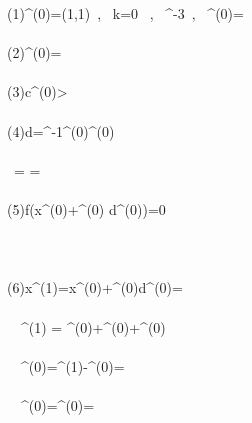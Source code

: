 \documentclass[]{report}
\begin{document}
\begin{program}
\left(1\right)\quad {}^{(0)}=\left(1,1\right)\ , \, k=0 \ , \ ^{-3}\ , \ ^{(0)}=\left[\begin{array}{cc}1 & 0 \\0 &1\end{array}\right] \\~ \\
\left(2\right)\quad {}^{(0)}=\left[-4 \ , \ 2\right]\\~  \\
\left(3\right)\quad \lvert \mathbf c^{(0)}>\epsilon\\~  \\
\left(4\right)\quad \mathbf d={^{-1}}^{(0)}^{(0)}\\~  \\
\quad \quad \quad \ = \left[\begin{array}{cc}1 & 0 \\ 0& 1 \end{array}\right]\left[\begin{array}{c}-4 \\ 2\end{array}\right]=\left[\begin{array}{c}-4\\ 2\end{array}\right]\\~  \\
\left(5\right)\quad \delta f\left(\mathbf x^{(0)}+\alpha^{(0)} \mathbf d^{(0)}\right)=0\\~\\
\quad \quad \quad {}\\~\\
\left(6\right)\quad \mathbf x^{(1)}=\mathbf x^{(0)}+\alpha^{(0)}\mathbf d^{(0)}=\left[2\ , \ 0.5\right]\\~  \\
\quad \quad \ \  ^{(1)} = ^{(0)}+^{(0)}+^{(0)}\\~  \\
\quad \quad \ \ ^{(0)}=^{(1)}-^{(0)}=\left[\begin{array}{c}3\\ -4\end{array}\right]\\~  \\
\quad \quad \ \ ^{(0)}=\alpha{}^{(0)}=\left[\begin{array}{c}1\\ -0.5\end{array}\right]\\~  \\

\end{program}
\end{document}
